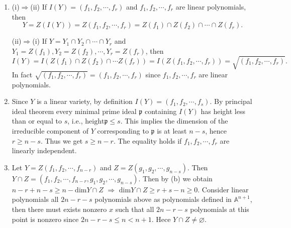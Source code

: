 \begin{solution}
  \begin{enumerate}
    \item (i)$\Rightarrow$(ii) If $I(Y)=(f_1,f_2,\cdots,f_r)$ and $f_1,f_2,\cdots,f_r$ are linear polynomials, then 
      \[
	Y=Z\left( I(Y) \right) =Z\left( f_1,f_2,\cdots,f_r \right) =Z(f_1)\cap Z(f_2)\cap \cdots\cap Z(f_r).
      \] 
      
      (ii)$\Rightarrow$(i) If $Y=Y_1\cap Y_2\cap \cdots \cap  Y_r$ and $Y_1=Z(f_1),Y_2=Z(f_2),\cdots,Y_r=Z(f_r)$, then 
      \[
	I(Y)=I\left(Z(f_1)\cap Z(f_2)\cap \cdots Z(f_r)\right)=I\left(Z\left( f_1,f_2,\cdots,f_r \right)\right)=\sqrt{(f_1,f_2,\cdots,f_r)} .
      \]
      In fact $\sqrt{(f_1,f_2,\cdots,f_r)} =\left( f_1,f_2,\cdots,f_r \right) $ since $f_1,f_2,\cdots,f_r$ are linear polynomials.
    \item Since $Y$ is a linear variety, by definition $I(Y)=\left( f_1,f_2,\cdots,f_s \right) $. By principal ideal theorem every minimal prime ideal $\mathfrak{p}$ containing $I(Y)$ has height less than or equal to $s$, i.e., $\mathrm{height}\mathfrak{p}\le s$. This implies the dimension of the irreducible component of $Y$ corresponding to $\mathfrak{p}$ is at least $n-s$, hence  $r\ge n-s$. Thus we get $s\ge n-r$. The equality holds if $f_1,f_2,\cdots,f_r$ are linearly independent.
    \item Let $Y=Z\left( f_1,f_2,\cdots,f_{n-r} \right) $ and  $Z=Z\left( g_1,g_2,\cdots,g_{n-s} \right) $. Then $Y\cap Z=\left( f_1,f_2,\cdots,f_{n-r},g_1,g_2,\cdots,g_{n-s} \right) $. Then by (b) we obtain  $n-r+n-s\ge n-\mathrm{dim}Y\cap Z$ $\Rightarrow$ $\mathrm{dim}Y\cap Z\ge r+s-n\ge 0$. Consider linear polynomials all $2n-r-s$ polynomials above as polynomials defined in $\mathbb{A}^{n+1}$, then there must exists nonzero $x$ such that all $2n-r-s$ polynomials at this point is nonzero since $2n-r-s\le n<n+1$. Hece  $Y\cap Z\neq \varnothing$.
  \end{enumerate}
\end{solution}

